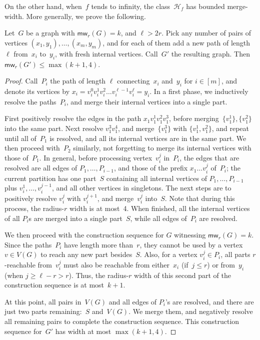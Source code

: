 \documentclass[a4paper,UKenglish,cleveref,thm-restate]{lipics-v2021}
\theoremstyle{remark}
\newcommand{\Hc}{\mathcal{H}}
\newcommand{\mw}{\mathsf{mw}}
\begin{document}
On the other hand, when~$f$ tends to infinity, the class~$\Hc_f$ has bounded merge-width.
More generally, we prove the following.
\begin{lemma}\label{lem:mw-long-paths}
    Let~$G$ be a graph with $\mw_r(G) = k$, and $\ell > 2r$. Pick any number of pairs of vertices $(x_1,y_1),\dots,(x_m,y_m)$,
    and for each of them add a new path of length~$\ell$ from~$x_i$ to~$y_i$, with fresh internal vertices.
    Call~$G'$ the resulting graph. Then $\mw_r(G') \le \max(k+1,4)$.
\end{lemma}
\begin{proof}
    Call~$P_i$ the path of length $\ell$ connecting~$x_i$ and~$y_i$ for $i \in [m]$,
    and denote its vertices by $x_i = v_i^0 v_i^1 v_i^2 \dots v_i^{\ell-1} v_i^{\ell} = y_i$.
    In a first phase, we inductively resolve the paths~$P_i$, and merge their internal vertices into a single part.

    First positively resolve the edges in the path $x_1 v_1^1 v_1^2 v_1^3$, before merging~$\{v_1^1\},\{v_1^2\}$ into the same part.
    Next resolve $v_1^3 v_1^4$, and merge~$\{v_1^3\}$ with $\{v_1^1,v_1^2\}$,
    and repeat until all of~$P_1$ is resolved, and all its internal vertices are in the same part.
    We then proceed with~$P_2$ similarly, not forgetting to merge its internal vertices with those of~$P_1$.
    In general, before processing vertex~$v_i^j$ in~$P_i$,
    the edges that are resolved are all edges of $P_1,\dots,P_{i-1}$, and those of the prefix $x_1 \dots v_i^j$ of~$P_i$;
    the current partition has one part~$S$ containing all internal vertices of $P_1,\dots,P_{i-1}$ plus $v_i^1,\dots,v_i^{j-1}$,
    and all other vertices in singletons.
    The next steps are to positively resolve $v_i^j$ with $v_i^{j+1}$, and merge~$v_i^j$ into~$S$.
    Note that during this process, the radius-$r$ width is at most~4.
    When finished, all the internal vertices of all $P_i$s are merged into a single part~$S$, while all edges of~$P_i$ are resolved.
    
    We then proceed with the construction sequence for $G$ witnessing $\mw_r(G) = k$.
    Since the paths~$P_i$ have length more than~$r$, they cannot be used by a vertex $v \in V(G)$ to reach any new part besides~$S$.
    Also, for a vertex $v_i^j \in P_i$, all parts $r$-reachable from~$v_i^j$ must also be reachable from either~$x_i$ (if~$j \le r$) or from~$y_i$ (when $j \ge \ell-r > r$).
    Thus, the radius-$r$ width of this second part of the construction sequence is at most~$k+1$.
    
    At this point, all pairs in~$V(G)$ and all edges of $P_i$'s are resolved, and there are just two parts remaining:~$S$ and~$V(G)$.
    We merge them, and negatively resolve all remaining pairs to complete the construction sequence.
    This construction sequence for~$G'$ has width at most $\max(k+1,4)$.
\end{proof}
\end{document}
